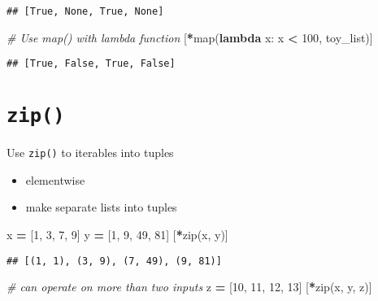 \documentclass[
]{book}
\newenvironment{Shaded}{\begin{snugshade}}{\end{snugshade}}
\newcommand{\BuiltInTok}[1]{#1}
\newcommand{\CommentTok}[1]{\textcolor[rgb]{0.56,0.35,0.01}{\textit{#1}}}
\newcommand{\DecValTok}[1]{\textcolor[rgb]{0.00,0.00,0.81}{#1}}
\newcommand{\KeywordTok}[1]{\textcolor[rgb]{0.13,0.29,0.53}{\textbf{#1}}}
\newcommand{\NormalTok}[1]{#1}
\newcommand{\OperatorTok}[1]{\textcolor[rgb]{0.81,0.36,0.00}{\textbf{#1}}}
\begin{document}
\begin{verbatim}
## [True, None, True, None]
\end{verbatim}

\begin{Shaded}
\begin{Highlighting}[]
\CommentTok{\# Use map() with lambda function}
\NormalTok{[}\OperatorTok{*}\BuiltInTok{map}\NormalTok{(}\KeywordTok{lambda}\NormalTok{ x: x }\OperatorTok{\textless{}} \DecValTok{100}\NormalTok{, toy\_list)]}
\end{Highlighting}
\end{Shaded}

\begin{verbatim}
## [True, False, True, False]
\end{verbatim}

\hypertarget{zip}{%
\section{\texorpdfstring{\texttt{zip()}}{zip()}}\label{zip}}

Use \texttt{zip()} to iterables into tuples

\begin{itemize}
\item
  elementwise
\item
  make separate lists into tuples
\end{itemize}

\begin{Shaded}
\begin{Highlighting}[]
\NormalTok{x }\OperatorTok{=}\NormalTok{ [}\DecValTok{1}\NormalTok{, }\DecValTok{3}\NormalTok{, }\DecValTok{7}\NormalTok{, }\DecValTok{9}\NormalTok{]}
\NormalTok{y }\OperatorTok{=}\NormalTok{ [}\DecValTok{1}\NormalTok{, }\DecValTok{9}\NormalTok{, }\DecValTok{49}\NormalTok{, }\DecValTok{81}\NormalTok{]}
\NormalTok{[}\OperatorTok{*}\BuiltInTok{zip}\NormalTok{(x, y)]}
\end{Highlighting}
\end{Shaded}

\begin{verbatim}
## [(1, 1), (3, 9), (7, 49), (9, 81)]
\end{verbatim}

\begin{Shaded}
\begin{Highlighting}[]
\CommentTok{\# can operate on more than two inputs}
\NormalTok{z }\OperatorTok{=}\NormalTok{ [}\DecValTok{10}\NormalTok{, }\DecValTok{11}\NormalTok{, }\DecValTok{12}\NormalTok{, }\DecValTok{13}\NormalTok{]}
\NormalTok{[}\OperatorTok{*}\BuiltInTok{zip}\NormalTok{(x, y, z)]}
\end{Highlighting}
\end{Shaded}
\end{document}
